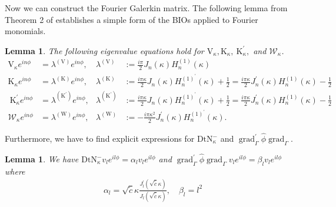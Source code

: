 \documentclass[12pt,journal,compsoc, onecolumn]{IEEEtran}
\newtheorem{lemma}[theorem]{Lemma}
\begin{document}
Now we can construct the Fourier Galerkin matrix. 
The following lemma from Theorem 2 of \cite{amini1998preconditioned} establishes a simple form of the BIOs applied to Fourier monomials.
\begin{lemma}
    The following eigenvalue equations hold for $\mathrm{V}_\kappa, \mathrm{K}_\kappa, \mathrm{~K}_{\kappa}^{\prime}, $ and $\mathcal{W}_{\kappa}$.
    $$
    \begin{aligned} 
        \mathrm{V}_{\kappa}e^{i n \phi} &=\lambda^{(\mathrm{V})} e^{i n \phi}, & \lambda^{(\mathrm{V})} &:=\frac{i \pi}{2} J_{n}(\kappa) H_{n}^{(1)}(\kappa) \\ 
        \mathrm{K}_{\kappa}e^{i n \phi} &=\lambda^{(\mathrm{K})} e^{i n \phi}, & \lambda^{(\mathrm{K})} &:=\frac{i \pi \kappa}{2} J_{n}(\kappa) H_{n}^{(1)^{\prime}}(\kappa)+\frac{1}{2}=\frac{i \pi \kappa}{2} J_{n}^{\prime}(\kappa) H_{n}^{(1)}(\kappa)-\frac{1}{2} \\ 
        \mathrm{~K}_{\kappa}^{\prime}e^{i n \phi} &=\lambda^{\left(\mathrm{K}^{\prime}\right)} e^{i n \phi}, & \lambda^{\left(\mathrm{K}^{\prime}\right)} &:=\frac{i \pi \kappa}{2} J_{n}(\kappa) H_{n}^{(1)^{\prime}}(\kappa)+\frac{1}{2}=\frac{i \pi \kappa}{2} J_{n}^{\prime}(\kappa) H_{n}^{(1)}(\kappa)-\frac{1}{2} \\ 
        \mathcal{W}_{\kappa}e^{i n \phi} &=\lambda^{(\mathrm{W})} e^{i n \phi}, & \lambda^{(\mathrm{W})} &:= - \frac{i \pi \kappa^{2}}{2} J_{n}^{\prime}(\kappa) H_{n}^{(1)^{\prime}}(\kappa).
    \end{aligned}
    $$
\end{lemma}
\noindent
Furthermore, we have to find explicit expressions for \(\mathrm{DtN}_{ \kappa}^{-}\) and \(\operatorname{grad}_{\Gamma}^{\prime} \hat{\phi} \operatorname{grad}_{\Gamma}\). 
\begin{lemma}
    We have \(\mathrm{DtN}_{ \kappa}^{-} v_l e^{il\phi} = \alpha_l v_l e^{il\phi}\) and \(\operatorname{grad}_{\Gamma}^{\prime} \hat{\phi} \operatorname{grad}_{\Gamma} v_l e^{il\phi}= \beta_l v_l e^{il\phi}\) where 
    \begin{align}
        \alpha_l = \sqrt{\tilde c}\kappa \frac{J_l^\prime(\sqrt{\tilde c}\kappa )}{J_l(\sqrt{\tilde c}\kappa)}, \quad \beta_l = l^2
    \end{align}
\end{lemma}
\end{document}
